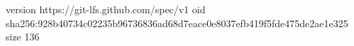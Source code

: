 version https://git-lfs.github.com/spec/v1
oid sha256:928b40734c02235b96736836ad68d7eace0e8037efb419f5fde475de2ae1e325
size 136
